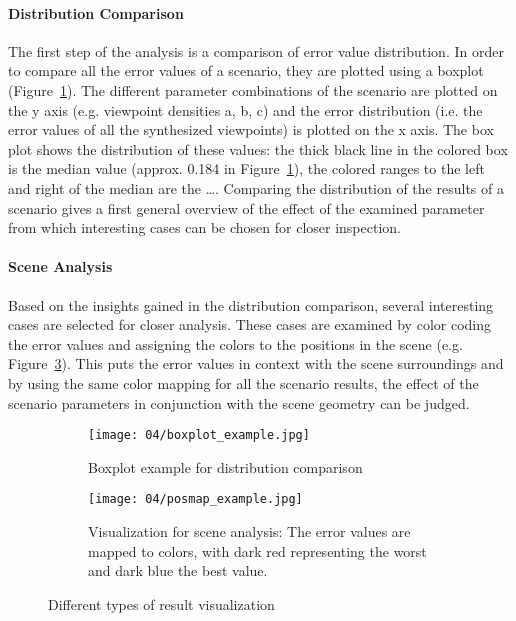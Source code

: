 \paragraph{Distribution Comparison}
The first step of the analysis is a comparison of error value distribution. In order to compare all the error values of a scenario, they are plotted using a boxplot (Figure~\ref{fig:boxplot_example}). The different parameter combinations of the scenario are plotted on the y axis (e.g. viewpoint densities a, b, c) and the error distribution (i.e. the error values of all the synthesized viewpoints) is plotted on the x axis. The box plot shows the distribution of these values: the thick black line in the colored box is the median value (approx. 0.184 in Figure~\ref{fig:boxplot_example}), the colored ranges to the left and right of the median are the \ldots {}. Comparing the distribution of the results of a scenario gives a first general overview of the effect of the examined parameter from which interesting cases can be chosen for closer inspection.

\paragraph{Scene Analysis}
Based on the insights gained in the distribution comparison, several interesting cases are selected for closer analysis. These cases are examined by color coding the error values and assigning the colors to the positions in the scene (e.g. Figure~\ref{fig:posmap_example}). This puts the error values in context with the scene surroundings and by using the same color mapping for all the scenario results, the effect of the scenario parameters in conjunction with the scene geometry can be judged.

\begin{figure}
\centering
    \hfill
    \begin{subfigure}[c]{0.45\textwidth}
            \centering
            \texttt{[image: 04/boxplot\_example.jpg]}
            \caption{Boxplot example for distribution comparison} \label{fig:boxplot_example}
    \end{subfigure}%
    \hfill
    \begin{subfigure}[c]{0.4\textwidth}
            \centering
            \texttt{[image: 04/posmap\_example.jpg]}
            \caption{Visualization for scene analysis: The error values are mapped to colors, with dark red representing the worst and dark blue the best value.} \label{fig:posmap_example}
    \end{subfigure}
    \hfill
  \caption{Different types of result visualization}
\end{figure}

